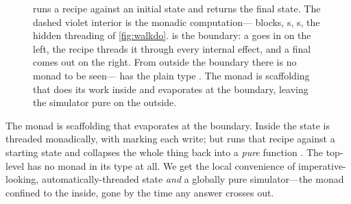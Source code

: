\begin{figure}[t]
\centering
{}
\caption[\texttt{execState} as the evaporation boundary]{ runs a
 recipe against an initial state and returns the final state. The dashed
violet interior is the monadic computation--- blocks, s,
s, the hidden threading of \cref{fig:walkdo}.  is the
boundary: a  goes in on the left, the recipe threads it through every
internal effect, and a final  comes out on the right. From outside the
boundary there is no monad to be seen--- has the plain type
. The monad is scaffolding that does its work
inside and evaporates at the boundary, leaving the simulator pure on the outside.}
\label{fig:execstate}
\end{figure}

\begin{keyidea}
The monad is scaffolding that evaporates at the boundary. Inside 
the state is threaded monadically, with  marking each write; but
 runs that recipe against a
starting state and collapses the whole thing back into a \emph{pure} function
. The top-level  has no monad in its type at
all. We get the local convenience of imperative-looking, automatically-threaded state
\emph{and} a globally pure simulator---the monad confined to the inside, gone by the
time any answer crosses out.
\end{keyidea}

